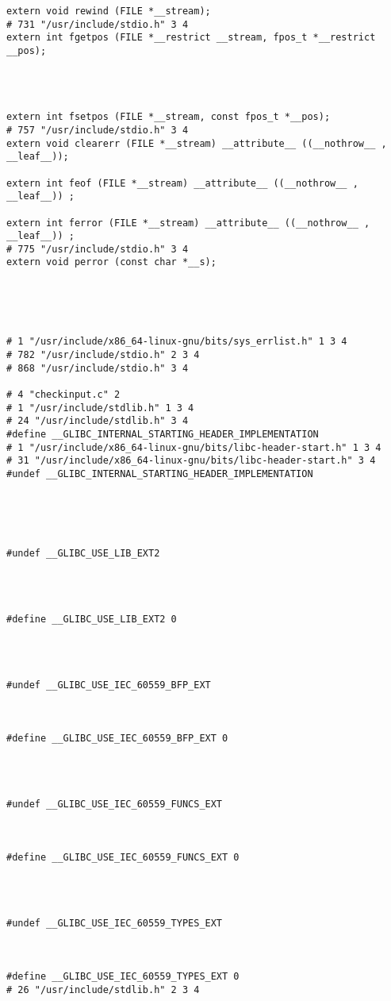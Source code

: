 \documentclass[11pt]{article}
\begin{document}
\begin{verbatim}
extern void rewind (FILE *__stream);
# 731 "/usr/include/stdio.h" 3 4
extern int fgetpos (FILE *__restrict __stream, fpos_t *__restrict __pos);




extern int fsetpos (FILE *__stream, const fpos_t *__pos);
# 757 "/usr/include/stdio.h" 3 4
extern void clearerr (FILE *__stream) __attribute__ ((__nothrow__ , __leaf__));

extern int feof (FILE *__stream) __attribute__ ((__nothrow__ , __leaf__)) ;

extern int ferror (FILE *__stream) __attribute__ ((__nothrow__ , __leaf__)) ;
# 775 "/usr/include/stdio.h" 3 4
extern void perror (const char *__s);





# 1 "/usr/include/x86_64-linux-gnu/bits/sys_errlist.h" 1 3 4
# 782 "/usr/include/stdio.h" 2 3 4
# 868 "/usr/include/stdio.h" 3 4

# 4 "checkinput.c" 2
# 1 "/usr/include/stdlib.h" 1 3 4
# 24 "/usr/include/stdlib.h" 3 4
#define __GLIBC_INTERNAL_STARTING_HEADER_IMPLEMENTATION 
# 1 "/usr/include/x86_64-linux-gnu/bits/libc-header-start.h" 1 3 4
# 31 "/usr/include/x86_64-linux-gnu/bits/libc-header-start.h" 3 4
#undef __GLIBC_INTERNAL_STARTING_HEADER_IMPLEMENTATION





#undef __GLIBC_USE_LIB_EXT2




#define __GLIBC_USE_LIB_EXT2 0




#undef __GLIBC_USE_IEC_60559_BFP_EXT



#define __GLIBC_USE_IEC_60559_BFP_EXT 0




#undef __GLIBC_USE_IEC_60559_FUNCS_EXT



#define __GLIBC_USE_IEC_60559_FUNCS_EXT 0




#undef __GLIBC_USE_IEC_60559_TYPES_EXT



#define __GLIBC_USE_IEC_60559_TYPES_EXT 0
# 26 "/usr/include/stdlib.h" 2 3 4



\end{verbatim}
\end{document}
